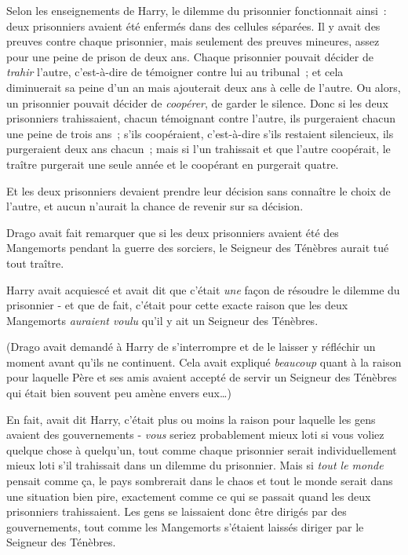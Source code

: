 Selon les enseignements de Harry, le dilemme du prisonnier fonctionnait ainsi~: deux prisonniers avaient été enfermés dans des cellules séparées. Il y avait des preuves contre chaque prisonnier, mais seulement des preuves mineures, assez pour une peine de prison de deux ans. Chaque prisonnier pouvait décider de \emph{trahir} l'autre, c'est-à-dire de témoigner contre lui au tribunal~; et cela diminuerait sa peine d'un an mais ajouterait deux ans à celle de l'autre. Ou alors, un prisonnier pouvait décider de \emph{coopérer}, de garder le silence. Donc si les deux prisonniers trahissaient, chacun témoignant contre l'autre, ils purgeraient chacun une peine de trois ans~; s'ils coopéraient, c'est-à-dire s'ils restaient silencieux, ils purgeraient deux ans chacun~; mais si l'un trahissait et que l'autre coopérait, le traître purgerait une seule année et le coopérant en purgerait quatre.

Et les deux prisonniers devaient prendre leur décision sans connaître le choix de l'autre, et aucun n'aurait la chance de revenir sur sa décision.

Drago avait fait remarquer que si les deux prisonniers avaient été des Mangemorts pendant la guerre des sorciers, le Seigneur des Ténèbres aurait tué tout traître.

Harry avait acquiescé et avait dit que c'était \emph{une} façon de résoudre le dilemme du prisonnier - et que de fait, c'était pour cette exacte raison que les deux Mangemorts \emph{auraient voulu} qu'il y ait un Seigneur des Ténèbres.

(Drago avait demandé à Harry de s'interrompre et de le laisser y réfléchir un moment avant qu'ils ne continuent. Cela avait expliqué \emph{beaucoup} quant à la raison pour laquelle Père et ses amis avaient accepté de servir un Seigneur des Ténèbres qui était bien souvent peu amène envers eux…)

En fait, avait dit Harry, c'était plus ou moins la raison pour laquelle les gens avaient des gouvernements - \emph{vous} seriez probablement mieux loti si vous voliez quelque chose à quelqu'un, tout comme chaque prisonnier serait individuellement mieux loti s'il trahissait dans un dilemme du prisonnier. Mais si \emph{tout le monde} pensait comme ça, le pays sombrerait dans le chaos et tout le monde serait dans une situation bien pire, exactement comme ce qui se passait quand les deux prisonniers trahissaient. Les gens se laissaient donc être dirigés par des gouvernements, tout comme les Mangemorts s'étaient laissés diriger par le Seigneur des Ténèbres.


